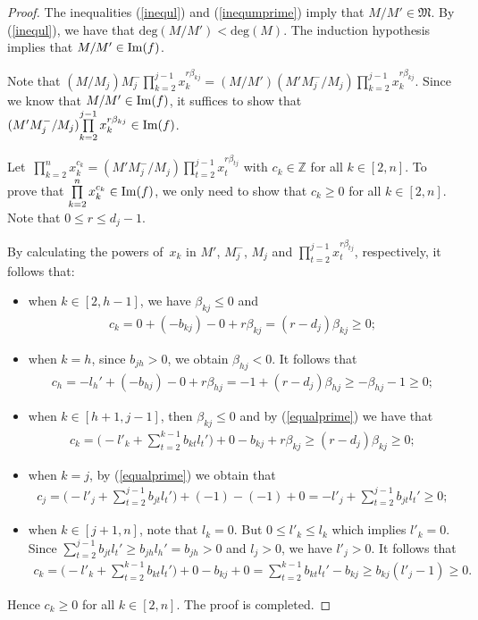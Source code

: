 \documentclass[10pt,a4paper]{amsart}
\numberwithin{equation}{section}
\begin{document}
\begin{proof}
The inequalities (\ref{inequl}) and (\ref{inequmprime}) imply that $M/M'\in\mathfrak{M}$. By (\ref{inequl}), we have that $\text{deg}(M/M')<\text{deg}(M)$. The induction hypothesis implies that $M/M'\in\mathop{\rm Im}(f)$.

Note that $(M/M_j)M_{j}^{-}\!\prod\limits_{k=2}^{j-1}\!x_{k}^{r\beta_{kj}}=(M/M')(M'M_{j}^{-}/M_j) \prod\limits_{k=2}^{j-1}\!x_{k}^{r\beta_{kj}}.$
Since we know that \mbox{$M/M'\in\mathop{\rm Im}(f)$}, it suffices to show that$(M'M_{j}^{-}/M_j) \!\prod\limits_{k=2}^{j-1}x_{k}^{r\beta_{kj}}\in\mathop{\rm Im}(f)$.

Let~$\prod\limits_{k=2}^{n}x_{k}^{c_k}=(M'M_{j}^{-}/M_j) \prod\limits_{t=2}^{j-1}x_{t}^{r\beta_{tj}}$ with $ c_k \in \mathbb{Z}$ for all $k \in [2,n]$. To prove that $\prod\limits_{k=2}^{n}x_{k}^{c_k}\in\mathop{\rm Im}(f)$, we only need to show that $c_k\geq0$ for all $k\in[2,n]$. Note that $0\leq r\leq d_{j}-1$.

By calculating the powers of~$x_k$ in $M'$, $M_{j}^{-}$, $M_j$ and $\prod\limits_{t=2}^{j-1}x_{t}^{r\beta_{tj}}$, respectively, it follows that:
\begin{itemize}\itemsep=0pt
 \item[(1)] when $k\in[2,h-1]$, we have $\beta_{kj}\leq0$ and
 \begin{gather*}
 c_k=0+(-b_{kj})-0+r\beta_{kj}=(r-d_{j})\beta_{kj}\geq 0;
 \end{gather*}
 \item[(2)] when $k=h$, since $b_{jh}>0$, we obtain $\beta_{hj}<0$. It follows that
 \begin{gather*}
 c_h=-l_{h}'+(-b_{hj})-0+r\beta_{hj}=-1+(r-d_{j})\beta_{hj}\geq -\beta_{hj}-1\geq0;
 \end{gather*}
 \item[(3)] when $k\in[h+1,j-1]$, then $\beta_{kj}\leq0$ and by (\ref{equalprime}) we have that
 \begin{gather*}
 c_k=\Bigg(-l'_k +\sum\limits_{t=2}^{k-1}b_{kt}l_{t}'\Bigg)+0-b_{kj}+r\beta_{kj} \geq(r-d_{j})\beta_{kj} \geq0;
 \end{gather*}
 \item[(4)] when $k=j$, by (\ref{equalprime}) we obtain that
 \begin{gather*}
 c_j=\Bigg(-l'_j +\sum\limits_{t=2}^{j-1}b_{jt}l_{t}'\Bigg)+(-1)-(-1)+0= -l'_j +\sum\limits_{t=2}^{j-1}b_{jt}l_{t}'\geq0;
 \end{gather*}
 \item[(5)] when $k\in[j+1,n]$, note that $l_k=0$. But $0\leq l'_k\leq l_k$ which implies $l'_k=0$. Since $\sum\limits_{t=2}^{j-1}b_{jt}l_{t}'\geq b_{jh}l_{h}'= b_{jh}>0$ and $l_j>0$, we have $l'_j>0$. It follows that
 \begin{gather*}
c_k=\Bigg(-l'_k +\sum\limits_{t=2}^{k-1}b_{kt}l_{t}'\Bigg)+0-b_{kj}+0= \sum\limits_{t=2}^{k-1}b_{kt}l_{t}' -b_{kj}\geq b_{kj}(l'_j-1)\geq0.
 \end{gather*}
\end{itemize}
Hence $c_k\geq0$ for all $k\in[2,n]$. The proof is completed.
\end{proof}
\end{document}
